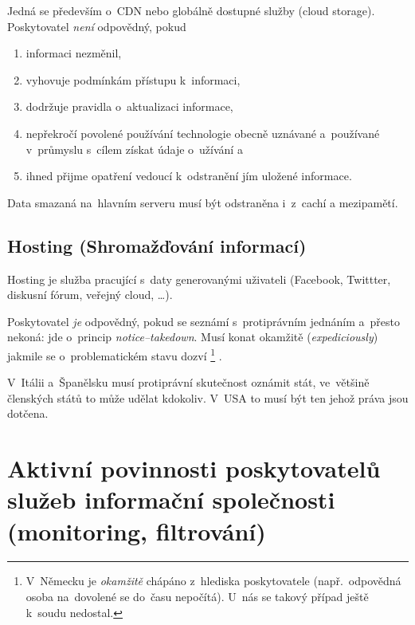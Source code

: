 Jedná se především o~CDN nebo globálně dostupné služby (cloud storage).
Poskytovatel \emph{není} odpovědný, pokud
\begin{enumerate}[label=\alph*)]
\item informaci nezměnil,
\item vyhovuje podmínkám přístupu k~informaci,
\item dodržuje pravidla o~aktualizaci informace,
\item nepřekročí povolené používání technologie obecně uznávané a~používané v~průmyslu s~cílem získat údaje o~užívání a
\item ihned přijme opatření vedoucí k~odstranění jím uložené informace.
\end{enumerate}

Data smazaná na~hlavním serveru musí být odstraněna i~z~cachí a mezipamětí.

\subsection{Hosting (Shromažďování informací)}

Hosting je služba pracující s~daty generovanými uživateli (Facebook, Twittter, diskusní fórum, veřejný cloud, \dots).

Poskytovatel \emph{je} odpovědný, pokud se seznámí s~protiprávním jednáním a~přesto nekoná: jde o~princip \emph{notice--takedown}.
Musí konat okamžitě (\emph{expediciously}) jakmile se o~problematickém stavu dozví%
\footnote{
	V~Německu je \emph{okamžitě} chápáno z~hlediska poskytovatele (např.~odpovědná osoba na~dovolené se do~času nepočítá).
	U~nás se takový případ ještě k~soudu nedostal.
}%
.

V~Itálii a~Španělsku musí protiprávní skutečnost oznámit stát, ve~většině členských států to může udělat kdokoliv.
V~USA to musí být ten jehož práva jsou dotčena.



\clearpage
\section{Aktivní povinnosti poskytovatelů služeb informační společnosti (monitoring, filtrování)}

